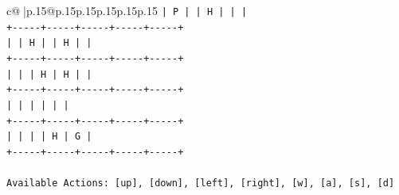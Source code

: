 \documentclass{article}
\begin{document}
{\begin{supertabular}{c@{$\;$}|p{.15\linewidth}@{}p{.15\linewidth}p{.15\linewidth}p{.15\linewidth}p{.15\linewidth}p{.15\linewidth}}
{{{\texttt{|  P  |     |  H  |     |     |} \\
\texttt{+{-}{-}{-}{-}{-}+{-}{-}{-}{-}{-}+{-}{-}{-}{-}{-}+{-}{-}{-}{-}{-}+{-}{-}{-}{-}{-}+} \\
\texttt{|     |  H  |     |  H  |     |} \\
\texttt{+{-}{-}{-}{-}{-}+{-}{-}{-}{-}{-}+{-}{-}{-}{-}{-}+{-}{-}{-}{-}{-}+{-}{-}{-}{-}{-}+} \\
\texttt{|     |     |  H  |  H  |     |} \\
\texttt{+{-}{-}{-}{-}{-}+{-}{-}{-}{-}{-}+{-}{-}{-}{-}{-}+{-}{-}{-}{-}{-}+{-}{-}{-}{-}{-}+} \\
\texttt{|     |     |     |     |     |} \\
\texttt{+{-}{-}{-}{-}{-}+{-}{-}{-}{-}{-}+{-}{-}{-}{-}{-}+{-}{-}{-}{-}{-}+{-}{-}{-}{-}{-}+} \\
\texttt{|     |     |     |  H  |  G  |} \\
\texttt{+{-}{-}{-}{-}{-}+{-}{-}{-}{-}{-}+{-}{-}{-}{-}{-}+{-}{-}{-}{-}{-}+{-}{-}{-}{-}{-}+} \\
\\ 
\texttt{Available Actions: {[}up{]}, {[}down{]}, {[}left{]}, {[}right{]}, {[}w{]}, {[}a{]}, {[}s{]}, {[}d{]}} \\
            }
        }
    }
     \\ \\


\end{supertabular}}
\end{document}
